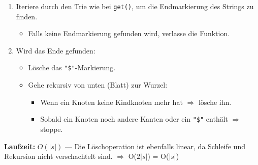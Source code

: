 \begin{enumerate}
    \item Iteriere durch den Trie wie bei \texttt{get()}, um die Endmarkierung des Strings zu finden.
    \begin{itemize}
        \item Falls keine Endmarkierung gefunden wird, verlasse die Funktion.
    \end{itemize}
    \item Wird das Ende gefunden:
    \begin{itemize}
        \item Lösche das \texttt{"\$"}-Markierung.
        \item Gehe rekursiv von unten (Blatt) zur Wurzel:
        \begin{itemize}
            \item Wenn ein Knoten keine Kindknoten mehr hat $\Rightarrow$ lösche ihn.
            \item Sobald ein Knoten noch andere Kanten oder ein \texttt{"\$"} enthält $\Rightarrow$ stoppe.
        \end{itemize}
    \end{itemize}
\end{enumerate}

\textbf{Laufzeit:} $O(|s|)$ — Die Löschoperation ist ebenfalls linear, da Schleife und Rekursion nicht verschachtelt sind. $\Rightarrow$ O($2|s|$) = O($|s|$)
